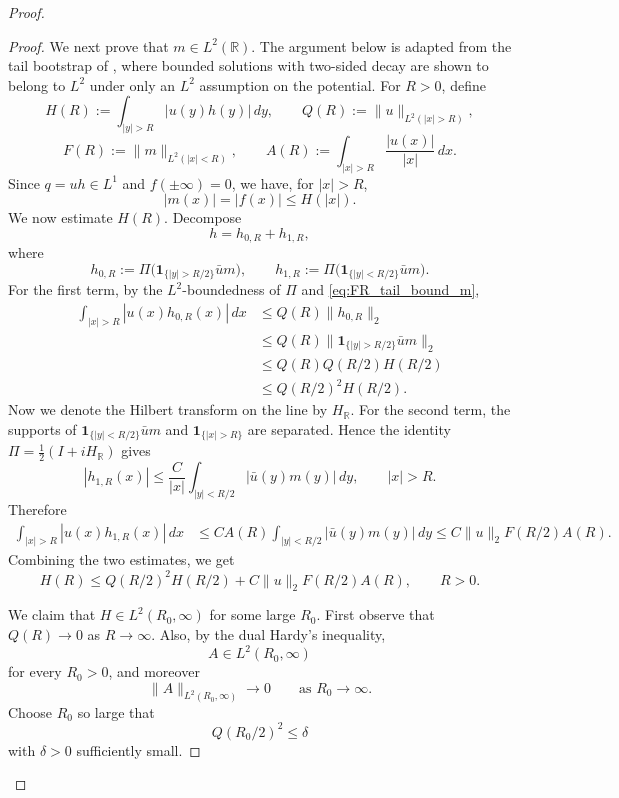 \documentclass[10pt]{article}
\numberwithin{equation}{section}
\numberwithin{theorem}{section}
\begin{document}
\begin{proof}
\begin{proof}
We next prove that \(m\in L^2(\mathbb R)\). The argument below is adapted from the tail bootstrap of \cite{78}, where bounded solutions with two-sided decay are shown to belong to \(L^2\) under only an \(L^2\) assumption on the potential. For \(R>0\), define
\[
H(R):=\int_{|y|>R}|u(y)h(y)|\,dy,
\qquad
Q(R):=\|u\|_{L^2(|x|>R)},
\]
\[
F(R):=\|m\|_{L^2(|x|<R)},
\qquad
A(R):=\int_{|x|>R}\frac{|u(x)|}{|x|}\,dx .
\]
Since \(q=uh\in L^1\) and \(f(\pm\infty)=0\), we have, for \(|x|>R\),
\begin{equation}
\label{eq:FR_tail_bound_m}
|m(x)|=|f(x)|
\le H(|x|).
\end{equation}
We now estimate \(H(R)\). Decompose
\[
h=h_{0,R}+h_{1,R},
\]
where
\[
h_{0,R}:=\Pi\bigl(\mathbf 1_{\{|y|>R/2\}}\bar u m\bigr),
\qquad
h_{1,R}:=\Pi\bigl(\mathbf 1_{\{|y|<R/2\}}\bar u m\bigr).
\]
For the first term, by the \(L^2\)-boundedness of \(\Pi\) and
\eqref{eq:FR_tail_bound_m},
\[
\begin{aligned}
\int_{|x|>R}|u(x)h_{0,R}(x)|\,dx
&\le
Q(R)\|h_{0,R}\|_2  \\
&\le
Q(R)\|\mathbf 1_{\{|y|>R/2\}}\bar u m\|_2  \\
&\le
Q(R)Q(R/2)H(R/2)  \\
&\le
Q(R/2)^2H(R/2).
\end{aligned}
\]
Now we denote the Hilbert transform on the line by $H_{\mathbb R}$. For the second term, the supports of
\(\mathbf 1_{\{|y|<R/2\}}\bar u m\) and \(\mathbf 1_{\{|x|>R\}}\) are separated.
Hence the identity $\Pi = \frac{1}{2} (I + iH_{\mathbb R})$ gives
\[
|h_{1,R}(x)|
\le
\frac{C}{|x|}
\int_{|y|<R/2}|\bar u(y)m(y)|\,dy,
\qquad |x|>R .
\]
Therefore
\[
\begin{aligned}
\int_{|x|>R}|u(x)h_{1,R}(x)|\,dx
&\le
C A(R)
\int_{|y|<R/2}|\bar u(y)m(y)|\,dy  \le
C\|u\|_2 F(R/2)A(R).
\end{aligned}
\]
Combining the two estimates, we get
\begin{equation}
\label{eq:FR_H_ineq}
H(R)
\le
Q(R/2)^2H(R/2)
+
C\|u\|_2F(R/2)A(R),
\qquad R>0.
\end{equation}

We claim that \(H\in L^2(R_0,\infty)\) for some large \(R_0\). First observe that
\(Q(R)\to0\) as \(R\to\infty\). Also, by the dual Hardy's inequality,
\[
A\in L^2(R_0,\infty)
\]
for every \(R_0>0\), and moreover
\[
\|A\|_{L^2(R_0,\infty)}\to0
\qquad\text{as }R_0\to\infty.
\]
Choose \(R_0\) so large that
\[
Q(R_0/2)^2\le \delta
\]
with \(\delta>0\) sufficiently small.


\end{proof}
\end{proof}
\end{document}
